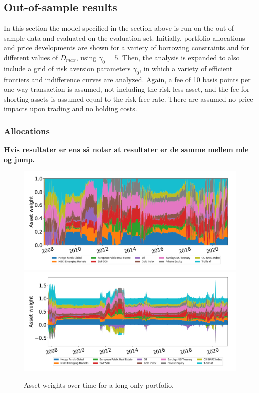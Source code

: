 \subsection{Out-of-sample results}

In this section the model specified in the section above is run on the out-of-sample data and evaluated on the evaluation set. Initially, portfolio allocations and price developments are shown for a variety of borrowing constraints and for different values of $D_{max}$, using $\gamma_0=5$. Then, the analysis is expanded to also include a grid of risk aversion parameters $\gamma_0$, in which a variety of efficient frontiers and indifference curves are analyzed. Again, a fee of 10 basis points per one-way transaction is assumed, not including the risk-less asset, and the fee for shorting assets is assumed equal to the risk-free rate. There are assumed no price-impacts upon trading and no holding costs.

\subsubsection*{Allocations}

\textbf{Hvis resultater er ens så noter at resultater er de samme mellem mle og jump.}


\begin{figure}[H]
    \centering
    \includegraphics[width=1\textwidth]{analysis/portfolio_exercise/images/mle/weights_lo.png}
    \includegraphics[width=1\textwidth]{analysis/portfolio_exercise/images/mle/weights_ls.png}
    \caption[Asset weights over time for a long-only portfolio]{Asset weights over time for a long-only portfolio.}
    \label{fig:MPC_port_weights_lo}
\end{figure}

